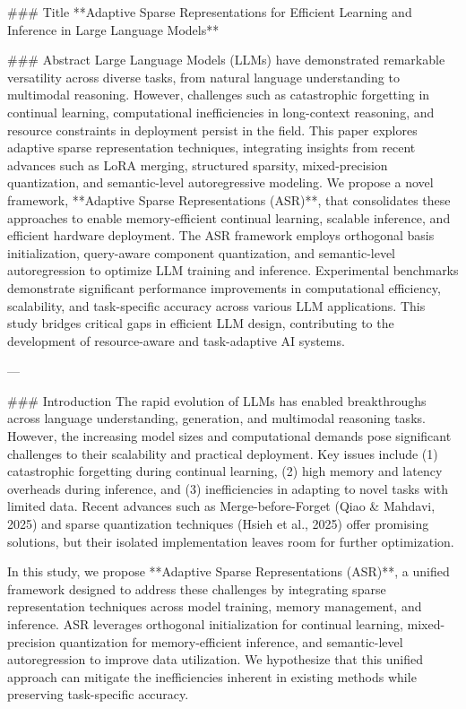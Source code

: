 ### Title  
**Adaptive Sparse Representations for Efficient Learning and Inference in Large Language Models**

### Abstract  
Large Language Models (LLMs) have demonstrated remarkable versatility across diverse tasks, from natural language understanding to multimodal reasoning. However, challenges such as catastrophic forgetting in continual learning, computational inefficiencies in long-context reasoning, and resource constraints in deployment persist in the field. This paper explores adaptive sparse representation techniques, integrating insights from recent advances such as LoRA merging, structured sparsity, mixed-precision quantization, and semantic-level autoregressive modeling. We propose a novel framework, **Adaptive Sparse Representations (ASR)**, that consolidates these approaches to enable memory-efficient continual learning, scalable inference, and efficient hardware deployment. The ASR framework employs orthogonal basis initialization, query-aware component quantization, and semantic-level autoregression to optimize LLM training and inference. Experimental benchmarks demonstrate significant performance improvements in computational efficiency, scalability, and task-specific accuracy across various LLM applications. This study bridges critical gaps in efficient LLM design, contributing to the development of resource-aware and task-adaptive AI systems.

---

### Introduction  
The rapid evolution of LLMs has enabled breakthroughs across language understanding, generation, and multimodal reasoning tasks. However, the increasing model sizes and computational demands pose significant challenges to their scalability and practical deployment. Key issues include (1) catastrophic forgetting during continual learning, (2) high memory and latency overheads during inference, and (3) inefficiencies in adapting to novel tasks with limited data. Recent advances such as Merge-before-Forget (Qiao & Mahdavi, 2025) and sparse quantization techniques (Hsieh et al., 2025) offer promising solutions, but their isolated implementation leaves room for further optimization.

In this study, we propose **Adaptive Sparse Representations (ASR)**, a unified framework designed to address these challenges by integrating sparse representation techniques across model training, memory management, and inference. ASR leverages orthogonal initialization for continual learning, mixed-precision quantization for memory-efficient inference, and semantic-level autoregression to improve data utilization. We hypothesize that this unified approach can mitigate the inefficiencies inherent in existing methods while preserving task-specific accuracy.

